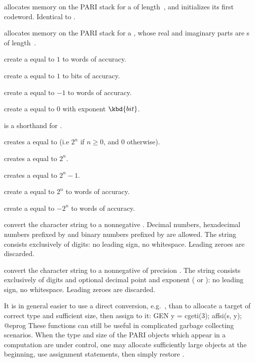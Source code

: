  allocates memory on the PARI stack for a 
of length~, and initializes its first codeword. Identical to
.

 allocates memory on the PARI stack for a
, whose real and imaginary parts are s
of length~.

 create a  equal to $1$ to 
words of accuracy.

 create a  equal to $1$ to
 bits of accuracy.

 create a  equal to $-1$ to 
words of accuracy.

 create a  equal to $0$ with
exponent $\kbd{bit}$.

 is a shorthand for .

 creates a  equal to  (i.e
$2^n$ if $n \geq 0$, and $0$ otherwise).

 creates a  equal to $2^n$.

 creates a  equal to $2^n - 1$.

 create a  equal to $2^n$
to  words of accuracy.

 create a  equal to $-2^n$
to  words of accuracy.

 convert the character string  to a
nonnegative .
Decimal numbers, hexadecimal numbers prefixed by  and binary numbers prefixed
by  are allowed.  The string  consists exclusively of digits:
no leading sign, no whitespace. Leading zeroes are discarded.

 convert the character string  to
a nonnegative  of precision . The string 
consists exclusively of digits and optional decimal point and exponent
( or ): no leading sign, no whitespace. Leading zeroes are
discarded.

It is in general easier to use a direct conversion,
e.g.~, than to allocate a target of correct type and
sufficient size, then assign to it:
\bprog
  GEN y = cgeti(3); affsi(s, y);
@eprog\noindent
These functions can still be useful in complicated garbage
collecting scenarios. When the type and size of the PARI objects which appear
in a computation are under control, one may allocate sufficiently large
objects at the beginning, use assignment statements, then simply restore
.

